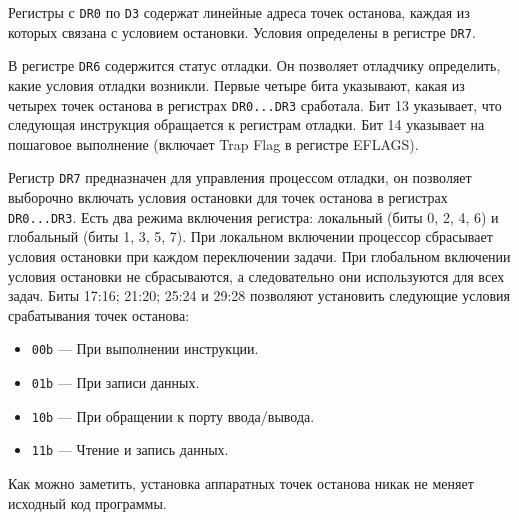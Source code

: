 Регистры с \verb!DR0! по \verb!D3! содержат линейные адреса точек останова,
каждая из которых связана с условием остановки. Условия определены в регистре
\verb!DR7!.

В регистре \verb!DR6! содержится статус отладки. Он позволяет отладчику
определить, какие условия отладки возникли. Первые четыре бита указывают, какая
из четырех точек останова в регистрах \verb!DR0...DR3! сработала. Бит 13
указывает, что следующая инструкция обращается к регистрам отладки. Бит 14
указывает на пошаговое выполнение (включает Trap Flag в регистре EFLAGS). 

Регистр \verb!DR7! предназначен для управления процессом отладки, он позволяет
выборочно включать условия остановки для точек останова в регистрах
\verb!DR0...DR3!. Есть два режима включения регистра: локальный (биты 0, 2, 4,
6) и глобальный (биты 1, 3, 5, 7). При локальном включении процессор сбрасывает
условия остановки при каждом переключении задачи. При глобальном включении
условия остановки не сбрасываются, а следовательно они используются для всех
задач. Биты 17:16; 21:20; 25:24 и 29:28 позволяют установить следующие условия
срабатывания точек останова:
\begin{itemize}
  \item \verb!00b! --- При выполнении инструкции.
  \item \verb!01b! --- При записи данных.
  \item \verb!10b! --- При обращении к порту ввода/вывода.
  \item \verb!11b! --- Чтение и запись данных.
\end{itemize}

Как можно заметить, установка аппаратных точек останова никак не меняет исходный
код программы.
